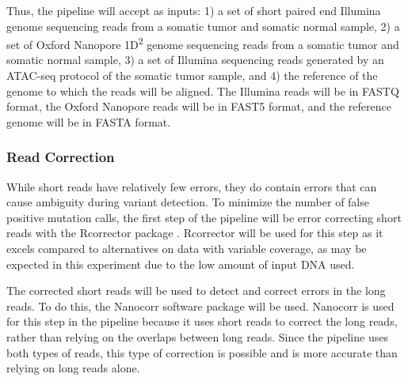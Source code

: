 Thus, the pipeline will accept as inputs: 1) a set of short paired end Illumina genome sequencing reads from a somatic tumor and somatic normal sample, 2) a set of Oxford Nanopore 1D\textsuperscript{2} genome sequencing reads from a somatic tumor and somatic normal sample, 3) a set of Illumina sequencing reads generated by an ATAC-seq protocol of the somatic tumor sample, and 4) the reference of the genome to which the reads will be aligned. The Illumina reads will be in FASTQ format, the Oxford Nanopore reads will be in FAST5 format, and the reference genome will be in FASTA format.

\subsubsection{Read Correction}
While short reads have relatively few errors, they do contain errors that can cause ambiguity during variant detection.
To minimize the number of false positive mutation calls, the first step of the pipeline will be error correcting short reads with the Rcorrector package \parencite{song_rcorrector:_2015}.
Rcorrector will be used for this step as it excels compared to alternatives on data with variable coverage, as may be expected in this experiment due to the low amount of input DNA used.



The corrected short reads will be used to detect and correct errors in the long reads. To do this, the Nanocorr \parencite{goodwin_oxford_2015} software package will be used.
Nanocorr is used for this step in the pipeline because it uses short reads to correct the long reads, rather than relying on the overlaps between long reads. Since the pipeline uses both types of reads, this type of correction is possible and is more accurate than relying on long reads alone.

